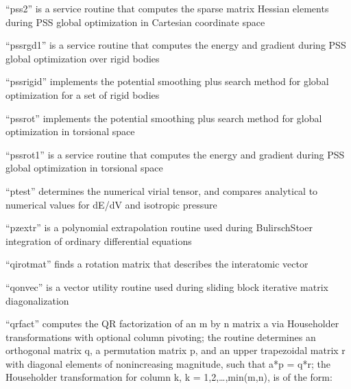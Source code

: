 \documentclass[letterpaper,11pt,english]{sphinxmanual}
\begin{document}
“pss2” is a service routine that computes the sparse
matrix Hessian elements during PSS global optimization
in Cartesian coordinate space


“pssrgd1” is a service routine that computes the energy and
gradient during PSS global optimization over rigid bodies


“pssrigid” implements the potential smoothing plus search method
for global optimization for a set of rigid bodies


“pssrot” implements the potential smoothing plus search method
for global optimization in torsional space


“pssrot1” is a service routine that computes the energy and
gradient during PSS global optimization in torsional space



“ptest” determines the numerical virial tensor, and compares
analytical to numerical values for dE/dV and isotropic pressure



“pzextr” is a polynomial extrapolation routine used during
Bulirsch\sphinxhyphen{}Stoer integration of ordinary differential equations


“qirotmat” finds a rotation matrix that describes the
interatomic vector


“qonvec” is a vector utility routine used during sliding
block iterative matrix diagonalization


“qrfact” computes the QR factorization of an m by n matrix a
via Householder transformations with optional column pivoting;
the routine determines an orthogonal matrix q, a permutation
matrix p, and an upper trapezoidal matrix r with diagonal
elements of nonincreasing magnitude, such that a*p = q*r; the
Householder transformation for column k, k = 1,2,…,min(m,n),
is of the form:
\end{document}
